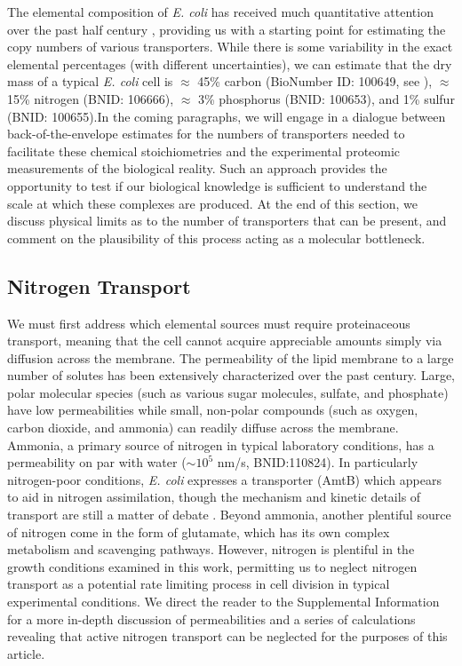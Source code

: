 The elemental composition of \textit{E. coli} has received much quantitative
attention over the past half century \citep{neidhardt1991, taymaz-nikerel2010,
heldal1985, bauer1976}, providing us with a starting point for estimating the
copy numbers of various transporters. While there is some variability in the
exact elemental percentages (with different uncertainties), we can estimate that
the dry mass of a typical \textit{E. coli} cell is $\approx$ 45\% carbon
(BioNumber ID: 100649, see ), $\approx$ 15\% nitrogen (BNID: 106666), $\approx$ 3\% phosphorus (BNID: 100653), and
1\% sulfur (BNID: 100655).In the coming paragraphs, we will
engage in a dialogue between back-of-the-envelope estimates for the numbers of
transporters needed to facilitate these chemical stoichiometries and the
experimental proteomic measurements of the biological reality. Such an approach
provides the opportunity to test if our biological knowledge is sufficient to
understand the scale at which these complexes are produced. At the end of this
section, we discuss physical limits as to the number of transporters that can be
present, and comment on the plausibility of this process acting as a molecular bottleneck.

\subsection{Nitrogen Transport}
We must first address which elemental sources must require proteinaceous
transport, meaning that the cell cannot acquire appreciable amounts simply
via diffusion across the membrane. The permeability of the lipid membrane to
a large number of solutes has been extensively characterized over the past
century. Large, polar molecular species (such as various sugar molecules,
sulfate, and phosphate) have low permeabilities while small, non-polar
compounds (such as oxygen, carbon dioxide, and ammonia) can readily diffuse
across the membrane. Ammonia, a primary source of nitrogen in typical
laboratory conditions, has a permeability on par with water ($\sim 10^5$
nm/s, BNID:110824). In particularly nitrogen-poor conditions,
\textit{E. coli} expresses a transporter (AmtB) which appears to aid in
nitrogen assimilation, though the mechanism and kinetic details of transport
are still a matter of debate \citep{heeswijk2013a, khademi2004}. Beyond
ammonia, another plentiful source of nitrogen come in the form of glutamate,
which has its own complex metabolism and scavenging pathways. However,
nitrogen is plentiful in the growth conditions examined in this work,
permitting us to neglect nitrogen transport as a potential rate limiting
process in cell division in typical experimental conditions. We direct the
reader to the Supplemental Information for a more in-depth discussion of
permeabilities and a series of calculations revealing that active nitrogen
transport can be neglected for the purposes of this article.

